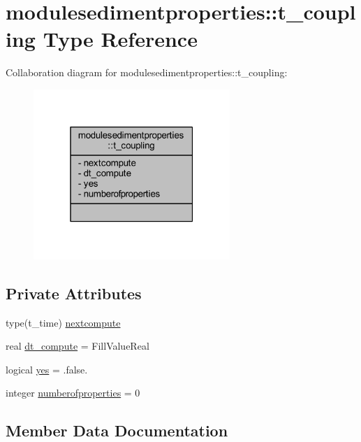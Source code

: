 \hypertarget{structmodulesedimentproperties_1_1t__coupling}{}\section{modulesedimentproperties\+:\+:t\+\_\+coupling Type Reference}
\label{structmodulesedimentproperties_1_1t__coupling}


Collaboration diagram for modulesedimentproperties\+:\+:t\+\_\+coupling\+:\nopagebreak
\begin{figure}[H]
\begin{center}
\leavevmode
\includegraphics[width=211pt]{structmodulesedimentproperties_1_1t__coupling__coll__graph}
\end{center}
\end{figure}
\subsection*{Private Attributes}
\begin{DoxyCompactItemize}
\item 
type(t\+\_\+time) \mbox{\hyperlink{structmodulesedimentproperties_1_1t__coupling_aaf67f3aa39af73ecff1580d2b88f70cc}{nextcompute}}
\item 
real \mbox{\hyperlink{structmodulesedimentproperties_1_1t__coupling_a4d3391f3bff5da465aa553b5b85cb723}{dt\+\_\+compute}} = Fill\+Value\+Real
\item 
logical \mbox{\hyperlink{structmodulesedimentproperties_1_1t__coupling_a07787853a2d930238b227f3021ab2de3}{yes}} = .false.
\item 
integer \mbox{\hyperlink{structmodulesedimentproperties_1_1t__coupling_a77988b26ca8f4cb2e24071a26bf94eae}{numberofproperties}} = 0
\end{DoxyCompactItemize}


\subsection{Member Data Documentation}
\mbox{\label{structmodulesedimentproperties_1_1t__coupling_a4d3391f3bff5da465aa553b5b85cb723}} 
